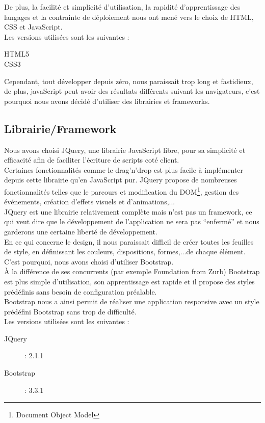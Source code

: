 \documentclass{sigplanconf}
\begin{document}
De plus, la facilité et simplicité d'utilisation, la rapidité d'apprentissage des langages et la contrainte de déploiement nous ont mené vers le choix de HTML, CSS et JavaScript.\\
Les versions utilisées sont les suivantes :
\begin{description}
\item [HTML5]
\item [CSS3]
\end{description}

Cependant, tout développer depuis zéro, nous paraissait trop long et fastidieux, de plus, javaScript peut avoir des résultats différents suivant les navigateurs, c'est pourquoi nous avons décidé d'utiliser des librairies et frameworks.

\subsection{Librairie/Framework}\label{librairieFramework}
Nous avons choisi JQuery\cite{urljQuery}, une librairie JavaScript libre, pour sa simplicité et efficacité afin de faciliter l'écriture de scripts coté client.\\
Certaines fonctionnalités comme le drag’n’drop est plus facile à implémenter depuis cette librairie qu’en JavaScript pur. JQuery propose de nombreuses fonctionnalités telles que le parcours et modification du DOM\footnote{Document Object Model}, gestion des événements, création d'effets visuels et d'animations,...\\
JQuery est une librairie relativement complète mais n'est pas un framework, ce qui veut dire que le développement de l'application ne sera pas ``enfermé'' et nous garderons une certaine liberté de développement.\\

En ce qui concerne le design, il nous paraissait difficil de créer toutes les feuilles de style, en définissant les couleurs, dispositions, formes,...de chaque élément. C'est pourquoi, nous avons choisi d’utiliser Bootstrap\cite{urlBootstrap}.\\
À la différence de ses concurrents (par exemple Foundation from Zurb) Bootstrap est plus simple d’utilisation, son apprentissage est rapide et il propose des styles prédéfinis sans besoin de configuration préalable.\\
Bootstrap nous a ainsi permit de réaliser une application responsive avec un style prédéfini Bootstrap sans trop de difficulté.\\
Les versions utilisées sont les suivantes :
\begin{description}
\item [JQuery] : 2.1.1
\item [Bootstrap] : 3.3.1
\end{description}
\end{document}
